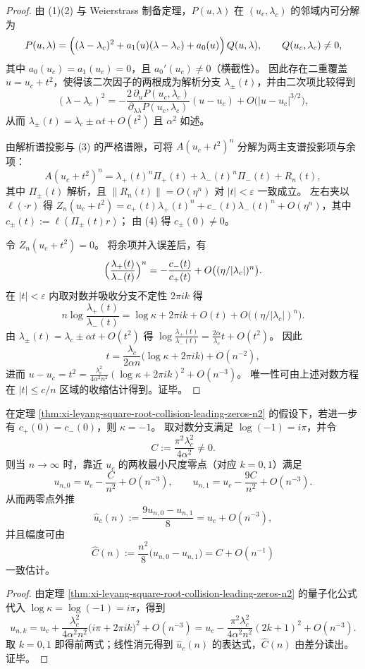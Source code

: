 \begin{proof}
由 (1)(2) 与 Weierstrass 制备定理，\(P(u,\lambda)\) 在 \((u_c,\lambda_c)\) 的邻域内可分解为
\[
P(u,\lambda)=\Bigl((\lambda-\lambda_c)^2+a_1(u)(\lambda-\lambda_c)+a_0(u)\Bigr)\,Q(u,\lambda),
\qquad Q(u_c,\lambda_c)\neq 0,
\]
其中 \(a_0(u_c)=a_1(u_c)=0\)，且 \(a_0'(u_c)\neq 0\)（横截性）。
因此存在二重覆盖 \(u=u_c+t^2\)，使得该二次因子的两根成为解析分支 \(\lambda_\pm(t)\)，并由二次项比较得到
\[
(\lambda-\lambda_c)^2
=
-\frac{2\,\partial_u P(u_c,\lambda_c)}{\partial_{\lambda\lambda}P(u_c,\lambda_c)}(u-u_c)
+O\bigl(|u-u_c|^{3/2}\bigr),
\]
从而 \(\lambda_\pm(t)=\lambda_c\pm\alpha t+O(t^2)\) 且 \(\alpha^2\) 如述。

由解析谱投影与 (3) 的严格谱隙，可将 \(A(u_c+t^2)^n\) 分解为两主支谱投影项与余项：
\[
A(u_c+t^2)^n=\lambda_+(t)^n\Pi_+(t)+\lambda_-(t)^n\Pi_-(t)+R_n(t),
\]
其中 \(\Pi_\pm(t)\) 解析，且 \(\|R_n(t)\|=O(\eta^n)\) 对 \(|t|<\varepsilon\) 一致成立。
左右夹以 \(\ell(\cdot r)\) 得
\(
Z_n(u_c+t^2)=c_+(t)\lambda_+(t)^n+c_-(t)\lambda_-(t)^n+O(\eta^n)
\)，其中 \(c_\pm(t):=\ell(\Pi_\pm(t)r)\)；
由 (4) 得 \(c_\pm(0)\neq 0\)。

令 \(Z_n(u_c+t^2)=0\)。
将余项并入误差后，有
\[
\Bigl(\frac{\lambda_+(t)}{\lambda_-(t)}\Bigr)^n=-\frac{c_-(t)}{c_+(t)}+O\bigl((\eta/|\lambda_c|)^n\bigr).
\]
在 \(|t|<\varepsilon\) 内取对数并吸收分支不定性 \(2\pi i k\) 得
\[
n\log\frac{\lambda_+(t)}{\lambda_-(t)}
=
\log\kappa+2\pi i k+O(t)+O\bigl((\eta/|\lambda_c|)^n\bigr).
\]
由 \(\lambda_\pm(t)=\lambda_c\pm\alpha t+O(t^2)\) 得
\(
\log\frac{\lambda_+(t)}{\lambda_-(t)}=\frac{2\alpha}{\lambda_c}t+O(t^2)
\)。
因此
\[
t=\frac{\lambda_c}{2\alpha n}\bigl(\log\kappa+2\pi i k\bigr)+O(n^{-2}),
\]
进而
\(
u-u_c=t^2=\frac{\lambda_c^2}{4\alpha^2n^2}(\log\kappa+2\pi i k)^2+O(n^{-3})
\)。
唯一性可由上述对数方程在 \(|t|\le c/n\) 区域的收缩估计得到。证毕。
\end{proof}

\begin{corollary}[对称可见性下的两零点外推与幅度消去]\label{cor:xi-leyang-two-leading-zeros-extrapolate-uc}
在定理 \ref{thm:xi-leyang-square-root-collision-leading-zeros-n2} 的假设下，若进一步有 \(c_+(0)=c_-(0)\)，则 \(\kappa=-1\)。
取对数分支满足 \(\log(-1)=i\pi\)，并令
\[
C:=\frac{\pi^2\lambda_c^2}{4\alpha^2}\neq 0.
\]
则当 \(n\to\infty\) 时，靠近 \(u_c\) 的两枚最小尺度零点（对应 \(k=0,1\)）满足
\[
u_{n,0}=u_c-\frac{C}{n^2}+O(n^{-3}),
\qquad
u_{n,1}=u_c-\frac{9C}{n^2}+O(n^{-3}).
\]
从而两零点外推
\[
\widehat u_c(n):=\frac{9u_{n,0}-u_{n,1}}{8}
=u_c+O(n^{-3}),
\]
并且幅度可由
\[
\widehat C(n):=\frac{n^2}{8}\bigl(u_{n,0}-u_{n,1}\bigr)=C+O(n^{-1})
\]
一致估计。
\end{corollary}
\begin{proof}
由定理 \ref{thm:xi-leyang-square-root-collision-leading-zeros-n2} 的量子化公式代入 \(\log\kappa=\log(-1)=i\pi\)，得到
\[
u_{n,k}
=u_c+\frac{\lambda_c^2}{4\alpha^2n^2}\bigl(i\pi+2\pi i k\bigr)^2+O(n^{-3})
=u_c-\frac{\pi^2\lambda_c^2}{4\alpha^2n^2}(2k+1)^2+O(n^{-3}).
\]
取 \(k=0,1\) 即得前两式；线性消元得到 \(\widehat u_c(n)\) 的表达式，\(\widehat C(n)\) 由差分读出。证毕。
\end{proof}

